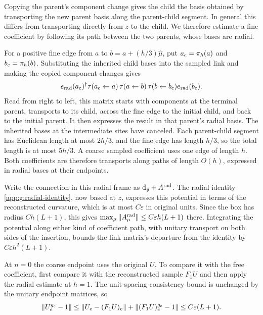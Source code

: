 \documentclass[11pt,a4paper]{article}
\theoremstyle{remark}
\newcommand{\dd}{\mathrm d}
\newcommand{\eps}{\varepsilon}
\begin{document}
Copying the parent's component change gives the child the basis obtained
by transporting the new parent basis along the parent-child segment.
In general this differs from transporting directly from $z$ to the
child. We therefore estimate a fine coefficient by following its path
between the two parents, whose bases are radial.

For a positive fine edge from $a$ to $b=a+(h/3)\hat\mu$, put
$a_{\rm c}=\pi_h(a)$ and $b_{\rm c}=\pi_h(b)$. Substituting
the inherited child bases into the sampled link and making the copied
component changes gives
\begin{equation}
 e_{\rm rad}(a_{\rm c})^\dagger
 \tau(a_{\rm c}\leftarrow a)\,
 \tau(a\leftarrow b)\,
 \tau(b\leftarrow b_{\rm c})
 e_{\rm rad}(b_{\rm c}).
\end{equation}
Read from right to left, this matrix starts with components at the
terminal parent, transports to its child, across the fine edge to the
initial child, and back to the initial parent. It then expresses the
result in that parent's radial basis. The inherited bases at the
intermediate sites have canceled. Each parent-child segment has
Euclidean length at most $2h/3$, and the fine edge has length $h/3$,
so the total length is at most $5h/3$. A coarse sampled coefficient
uses one edge of length $h$. Both coefficients are therefore
transports along paths of length $O(h)$, expressed in radial bases
at their endpoints.

Write the connection in this radial frame as
$\dd_y+A^{\rm rad}$. The radial identity
\eqref{app:g:radial-identity}, now based at $z$, expresses this
potential in terms of the reconstructed curvature, which is at most
$C\eps$ in original units.
Since the box has radius $Ch(L+1)$, this gives
$\max_\mu\|A^{\rm rad}_\mu\|\le C\eps h(L+1)$ there.
Integrating the potential along either kind of coefficient path, with
unitary transport on both sides of the insertion, bounds the link
matrix's departure from the identity by $C\eps h^2(L+1)$.

At $n=0$ the coarse endpoint uses the original $U$. To compare it
with the free coefficient, first compare it with the reconstructed
sample $F_1U$ and then apply the radial estimate at $h=1$.
The unit-spacing consistency bound is unchanged by the unitary endpoint
matrices, so
\begin{equation}
 \|U^{g_{\rm c}}_e-1\|
 \le \|U_e-(F_1U)_e\|+\|(F_1U)^{g_{\rm c}}_e-1\|
 \le C\eps(L+1).
\end{equation}
\end{document}
